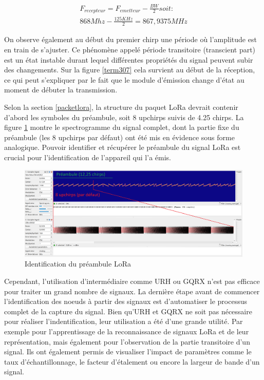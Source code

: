 \begin{align}
    F_{recepteur} = F_{emetteur} - \frac{BW}{2} soit: \\
    868Mhz - \frac{125KHz}{2} = 867,9375MHz
\end{align}

On observe également au début du premier chirp une période où l'amplitude est en train de s'ajuster. Ce phénomène appelé période transitoire (transcient part) est un état instable durant lequel différentes propriétés du signal peuvent subir des changements. Sur la figure \ref{term307} cela survient au début de la réception, ce qui peut s'expliquer par le fait que le module d'émission change d'état au moment de débuter la transmission.

\vspace{0.1cm}

Selon la section \ref{packetlora}, la structure du paquet \ac{LoRa} devrait contenir d'abord les symboles du préambule, soit 8 upchirps suivis de 4.25 chirps. La figure \ref{term308} montre le spectrogramme du signal complet, dont la partie fixe du préambule (les 8 upchirps par défaut) ont été mis en évidence sous forme analogique. Pouvoir identifier et récupérer le préambule du signal \ac{LoRa} est crucial pour l'identification de l'appareil qui l'a émis.


\begin{figure}[h]
\centering

\includegraphics[scale=0.18]{images/urh6.png}
\caption{Identification du préambule LoRa}\label{term308}
\end{figure}

Cependant, l'utilisation d'intermédiaire comme \ac{URH} ou GQRX n'est pas efficace pour traiter un grand nombre de signaux. La dernière étape avant de commencer l'identification des noeuds à partir des signaux est d'automatiser le processus complet de la capture du signal. Bien qu'\ac{URH} et GQRX ne soit pas nécessaire pour réaliser l'indentification, leur utilisation a été d'une grande utilité. Par exemple pour l'apprentissage de la reconnaissance de signaux \ac{LoRa} et de leur représentation, mais également pour l'observation de la partie transitoire d'un signal. Ils ont également permis de visualiser l'impact de paramètres comme le taux d'échantillonnage, le facteur d'étalement ou encore la largeur de bande d'un signal.


